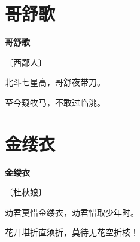 \documentclass[12pt,UTF-8,openany,fontset=none]{ctexbook}
\begin{document}
\vspace{8pt}
\clearpage

\section{哥舒歌}


\begin{center}
    {\bfseries 哥舒歌}

    \vspace{18pt}

    \begin{large}\xuwen
        〔西鄙人〕
    \end{large}

\end{center}

    \vspace{18pt}

\begin{center}
    \begin{Large}

        北斗七星高，哥舒夜带刀。

        至今窥牧马，不敢过临洮。

    \end{Large}

\end{center}

\vspace{8pt}
\clearpage

\section{金缕衣}


\begin{center}
    {\bfseries 金缕衣}

    \vspace{18pt}

    \begin{large}\xuwen
        〔杜秋娘〕
    \end{large}

\end{center}

    \vspace{18pt}

\begin{center}
    \begin{Large}

        劝君莫惜金缕衣，劝君惜取少年时。

        花开堪折直须折，莫待无花空折枝！

    \end{Large}

\end{center}
\end{document}
